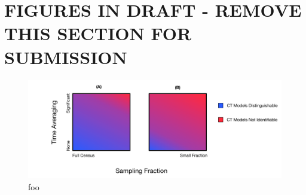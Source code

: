\documentclass[10pt,letterpaper]{article}
\begin{document}

\clearpage
\section*{FIGURES IN DRAFT - REMOVE THIS SECTION FOR SUBMISSION}
\setcounter{figure}{0}


\begin{figure}[ht]
\centering
\includegraphics[scale=0.3]{figure/equifinality-transmission-bias-scenarios.pdf}
\caption{foo}
\label{img:fig-1-study-scenarios}
\end{figure}
\end{document}
